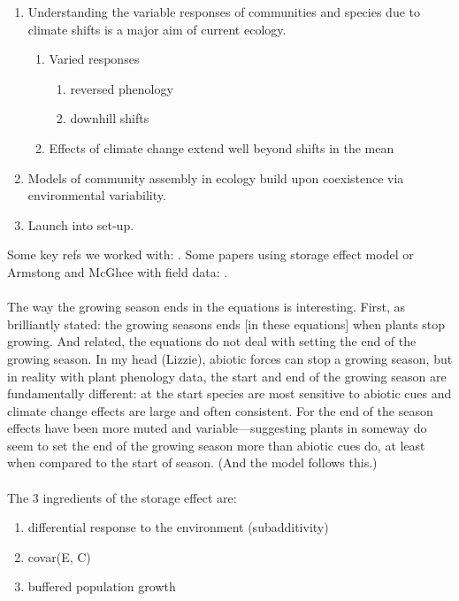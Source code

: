 \documentclass[11pt,a4paper,oneside]{article}
\begin{document}
\begin{enumerate}
\item Understanding the variable responses of communities and species
  due to climate shifts is a major aim of current
ecology.
\begin{enumerate}
\item Varied responses
\begin{enumerate}
\item reversed phenology \citep{yu2010} 
\item downhill shifts \citep{Crimmins:2011dq}
\end{enumerate}
\item Effects of climate change extend well beyond shifts in the mean
\end{enumerate}
\item Models of community assembly in ecology build upon coexistence
  via environmental variability.
\item Launch into set-up.
\end{enumerate}
\noindent Some key refs we worked with:
\citep{Chesson:1993gi,Chesson:2000ak,Chesson:2000vd,Chesson:2004eo}. Some
papers using storage effect model or Armstong and McGhee with field
data: \citep{Angert:2009ng,Kuang:2008ri,Kuang:2009rj,Levine:2009ym}.
\\
\\
\noindent The way the growing season ends in the equations is
interesting. First, as brilliantly stated: the growing seasons ends
[in these equations] when plants stop growing. And related, the
equations do not deal with setting the end of the growing season. In
my head (Lizzie), abiotic forces can stop a growing season, but in
reality with plant phenology data, the start and end of the growing
season are fundamentally different: at the start species are most
sensitive to abiotic cues and climate change effects are large and
often consistent. For the end of the season effects have been more
muted and variable---suggesting plants in someway do seem to set the
end of the growing season more than abiotic cues do, at least when
compared to the start of season. (And the model follows this.)
\\
\\
\noindent The 3 ingredients of the storage effect are:
\begin{enumerate}
\item differential response to the environment (subadditivity)
\item covar(E, C)
\item buffered population growth
\end{enumerate}
\end{document}
